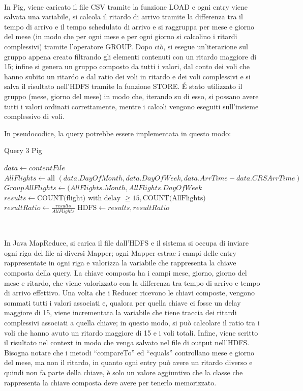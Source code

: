 \documentclass[11pt]{article} %
\begin{document}
~

In Pig, viene caricato il file CSV tramite la funzione LOAD e ogni entry viene salvata una variabile, si calcola il ritardo di arrivo tramite la differenza tra il tempo di arrivo e il tempo schedulato di arrivo e si raggruppa per mese e giorno del mese (in modo che per ogni mese e per ogni giorno si calcolino i ritardi complessivi) tramite l'operatore GROUP. Dopo ciò, si esegue un'iterazione sul gruppo appena creato filtrando gli elementi contenuti con un ritardo maggiore di 15; infine si genera un gruppo composto da tutti i valori, dal conto dei voli che hanno subito un ritardo e dal ratio dei voli in ritardo e dei voli complessivi e si salva il risultato nell'HDFS tramite la funzione STORE. \'E stato utilizzato il gruppo (mese, giorno del mese) in modo che, iterando su di esso, si possano avere tutti i valori ordinati correttamente, mentre i calcoli vengono eseguiti sull'insieme complessivo di voli. 

In pseudocodice, la query potrebbe essere implementata in questo modo:

\begin{algorithm}
\caption{Query 3 Pig}\label{euclid}
\begin{algorithmic}[0]
\State $data \gets contentFile$
\State $AllFlights \gets \text{all } (data.DayOfMonth, data.DayOfWeek, data.ArrTime - data.CRSArrTime)$
\State $GroupAllFlights \gets (AllFlights.Month, AllFlights.DayOfWeek$
	\State $results \gets \text{COUNT(flight) with delay }  \geqslant 15, \text{COUNT(AllFlights) }$
	\State $resultRatio \gets \frac{results}{AllFlights}$
\EndFor
\State $\text{HDFS}\gets results, resultRatio$
\end{algorithmic}
\end{algorithm}

~

In Java MapReduce, si carica il file dall'HDFS e il sistema si occupa di inviare ogni riga del file ai diversi Mapper; ogni Mapper estrae i campi delle entry rappresentate in ogni riga e valorizza la variabile che rappresenta la chiave composta della query. La chiave composta ha i campi mese, giorno, giorno del mese e ritardo, che viene valorizzato con la differenza tra tempo di arrivo e tempo di arrivo effettivo. Una volta che i Reducer ricevono le chiavi composte, vengono sommati tutti i valori associati e, qualora per quella chiave ci fosse un delay maggiore di 15, viene incrementata la variabile che tiene traccia dei ritardi complessivi associati a quella chiave; in questo modo, si può calcolare il ratio tra i voli che hanno avuto un ritardo maggiore di 15 e i voli totali. Infine, viene scritto il risultato nel context in modo che venga salvato nel file di output nell'HDFS. Bisogna notare che i metodi ``compareTo'' ed ``equals'' controllano mese e giorno del mese, ma non il ritardo, in quanto ogni entry può avere un ritardo diverso e quindi non fa parte della chiave, è solo un valore aggiuntivo che la classe che rappresenta la chiave composta deve avere per tenerlo memorizzato. 
\end{document}
